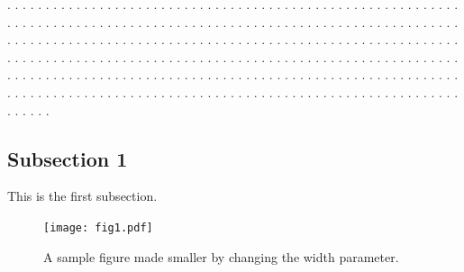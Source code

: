 \documentclass[twocolumn]{revtex4}
\begin{document}
. . . . . . . . . . . . . . . . . . . . . . . . . . . . . . . . . . . . . . . .
. . . . . . . . . . . . . . . . . . . . . . . . . . . . . . . . . . . . . . . .
. . . . . . . . . . . . . . . . . . . . . . . . . . . . . . . . . . . . . . . .
. . . . . . . . . . . . . . . . . . . . . . . . . . . . . . . . . . . . . . . .
. . . . . . . . . . . . . . . . . . . . . . . . . . . . . . . . . . . . . . . .
. . . . . . . . . . . . . . . . . . . . . . . . . . . . . . . . . . . . . . . .
. . . . . . . . . . . . . . . . . . . . . . . . . . . . . . . . . . . . . . . .
. . . . . . . . . . . . . . . . . . . . . . . . . . . . . . . . . . . . . . . .
. . . . . . . . . . . . . . . . . . . . . . . . . . . . . . . . . . . . . . . .

\subsection{Subsection 1}

This is the first subsection.
\begin{figure}[h!]
\centering
\texttt{[image: fig1.pdf]}
\caption{A sample figure made smaller by changing the width parameter.}
\label{fig:small_sample}
\end{figure}
\end{document}
